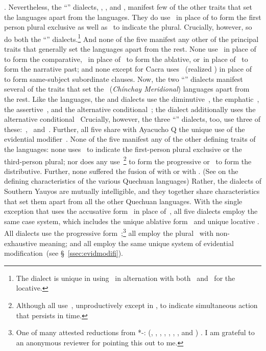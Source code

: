 \citep[247]{CerroP87}. Nevertheless, the ``\QI{}'' dialects, \ACH{}, \CH{}, and \SP{}, manifest few of the other traits that set the \QI{} languages apart from the \QII{} languages. They do use~ in place of  to form the first person plural exclusive as well as~ to indicate the plural. Crucially, however, so do both the ``\QII{}'' \SYQ{} dialects.\footnote{The \CH{} dialect is unique in using~ in alternation with both~ and~ for the locative.} And none of the five manifest any other of the principal traits that generally set the \QI{} languages apart from the rest. None use~ in place of~ to form the comparative,~ in place of~ to form the ablative, or~in place of~ to form the narrative past; and none except for Cacra uses~ (realized \textipa{[l]}) in place of~ to form same-subject subordinate clauses. Now, the two ``\QII{}'' \SYQ{} dialects manifest several of the traits that set the \QIIC{}~(\textit{Ch\'inchay Meridional}) languages apart from the rest. Like the \QIIC{} languages, the \AMV{} and \LT{} dialects use the diminutive~, the emphatic~, the assertive~, and the alternative conditional~; the \AMV{} dialect additionally uses the alternative conditional~ Crucially, however, the three ``\QI{}'' \SYQ{} dialects, too, use three of these:~,~ and~. Further, all five share with Ayacucho Q the unique use of the evidential modifier~. None of the five manifest any of the other defining traits of the \QIIC{} languages: none uses~ to indicate the first-person plural exclusive or the third-person plural; nor does any use~\footnote{Although all use~, unproductively except in \SP{}, to indicate simultaneous action that persists in time.} to form the progressive or~ to form the distributive. Further, none suffered the fusion of  with  or  with . (See \citet[226--248]{CerroP87} on the defining characteristics of the various Quechuan languages) Rather, the dialects of Southern Yauyos are mutually intelligible, and they together share characteristics that set them apart from all the other Quechuan languages. With the single exception that \textsc{\CH{}} uses the accusative form~ in place of~, all five dialects employ the same case system, which includes the unique ablative form~ and unique locative . All dialects use the progressive form~;\footnote{One of many attested reductions from *-: (, , , , , , , and ) \citep[213--219, 260--268, 290]{Hintz}. I am grateful to an anonymous reviewer for pointing this out to me.} all employ the plural~ with non-exhaustive meaning; and all employ the same unique system of evidential modification~(see \S~\ref{ssec:evidmodifi}). 